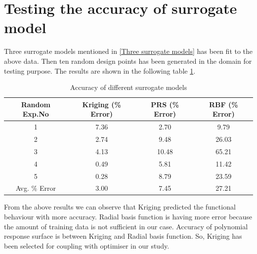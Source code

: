\section{Testing the accuracy of surrogate model}

Three surrogate models mentioned in \ref{Three surrogate models} has been fit to the above data. Then ten random design points has been generated in the domain for testing purpose. The results are shown in the following table \ref{Accuracy of different surrogate models}.

\begin{table}[H]
	\caption{Accuracy of different surrogate models}
	\label{Accuracy of different surrogate models}
	\centering
	\begin{tabular}{cccc}
		\hline \hline
		Random Exp.No	&Kriging (\% Error)	&PRS (\% Error)	&RBF (\% Error) \\
		\hline \hline
		1	&7.36	&2.70	&9.79 \\
		2	&2.74	&9.48	&26.03 \\
		3	&4.13	&10.48	&65.21 \\ 
		4	&0.49	&5.81	&11.42 \\
		5	&0.28	&8.79	&23.59 \\
		\hline \hline
		Avg. \% Error	&3.00	&7.45	&27.21 \\
		\hline \hline
	\end{tabular}
\end{table}
From the above results we can observe that Kriging predicted the functional behaviour with more accuracy. Radial basis function is having more error because the amount of training data is not sufficient in our case. Accuracy of polynomial response surface is between Kriging and Radial basis function. So, Kriging has been selected for coupling with optimiser in our study.
